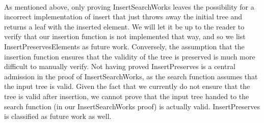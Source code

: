 \paragraph{}
As mentioned above, only proving InsertSearchWorks leaves the possibility for a incorrect implementation of insert that just throws away the initial tree and returns a leaf with the inserted element. We will let it be up to the reader to verify that our insertion function is not implemented that way, and so we list InsertPreservesElements as future work. Conversely, the assumption that the insertion function ensures that the validity of the tree is preserved is much more difficult to manually verify. Not having proved InsertPreserves is a central admission in the proof of InsertSearchWorks, as the search function assumes that the input tree is valid. Given the fact that we currently do not ensure that the tree is valid after insertion, we cannot prove that the input tree handed to the search function (in our InsertSearchWorks proof) is actually valid. InsertPreserves is classified as future work as well.
